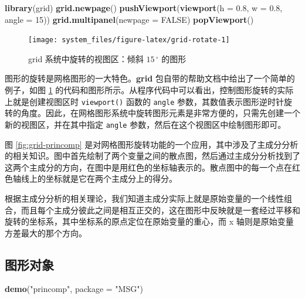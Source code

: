 \documentclass[
  b5paper,
  UTF8,twoside]{book}
\newenvironment{Shaded}{\begin{snugshade}}{\end{snugshade}}
\newcommand{\AttributeTok}[1]{\textcolor[rgb]{0.13,0.29,0.53}{#1}}
\newcommand{\ConstantTok}[1]{\textcolor[rgb]{0.56,0.35,0.01}{#1}}
\newcommand{\DecValTok}[1]{\textcolor[rgb]{0.00,0.00,0.81}{#1}}
\newcommand{\FloatTok}[1]{\textcolor[rgb]{0.00,0.00,0.81}{#1}}
\newcommand{\FunctionTok}[1]{\textcolor[rgb]{0.13,0.29,0.53}{\textbf{#1}}}
\newcommand{\NormalTok}[1]{#1}
\newcommand{\StringTok}[1]{\textcolor[rgb]{0.31,0.60,0.02}{#1}}
\begin{document}
\begin{Shaded}
\begin{Highlighting}[]
\FunctionTok{library}\NormalTok{(grid)}
\FunctionTok{grid.newpage}\NormalTok{()}
\FunctionTok{pushViewport}\NormalTok{(}\FunctionTok{viewport}\NormalTok{(}\AttributeTok{h =} \FloatTok{0.8}\NormalTok{, }\AttributeTok{w =} \FloatTok{0.8}\NormalTok{, }\AttributeTok{angle =} \DecValTok{15}\NormalTok{))}
\FunctionTok{grid.multipanel}\NormalTok{(}\AttributeTok{newpage =} \ConstantTok{FALSE}\NormalTok{)}
\FunctionTok{popViewport}\NormalTok{()}
\end{Highlighting}
\end{Shaded}

\begin{figure}

{\centering \texttt{[image: system\_files/figure-latex/grid-rotate-1]} 

}

\caption[grid 系统中旋转的视图区]{grid 系统中旋转的视图区：倾斜 \(15\,^{\circ}\) 的图形}\label{fig:grid-rotate}
\end{figure}





图形的旋转是网格图形的一大特色。\textbf{grid} 包自带的帮助文档中给出了一个简单的例子，如图 \ref{fig:grid-rotate} 的代码和图形所示。从程序代码中可以看出，控制图形旋转的实际上就是创建视图区时 \texttt{viewport()} 函数的 \texttt{angle} 参数，其数值表示图形逆时针旋转的角度。因此，在网格图形系统中旋转图形元素是非常方便的，只需先创建一个新的视图区，并在其中指定 \texttt{angle} 参数，然后在这个视图区中绘制图形即可。

图 \ref{fig:grid-princomp} 是对网格图形旋转功能的一个应用，其中涉及了主成分分析的相关知识。图中首先绘制了两个变量之间的散点图，然后通过主成分分析找到了这两个主成分的方向，在图中是用红色的坐标轴表示的。散点图中的每一个点在红色轴线上的坐标就是它在两个主成分上的得分。

根据主成分分析的相关理论，我们知道主成分实际上就是原始变量的一个线性组合，而且每个主成分彼此之间是相互正交的，这在图形中反映就是一套经过平移和旋转的坐标系，其中坐标系的原点定位在原始变量的重心，而 x 轴则是原始变量方差最大的那个方向。

\subsection{图形对象}\label{ux56feux5f62ux5bf9ux8c61}

\begin{Shaded}
\begin{Highlighting}[]
\FunctionTok{demo}\NormalTok{(}\StringTok{"princomp"}\NormalTok{, }\AttributeTok{package =} \StringTok{"MSG"}\NormalTok{)}
\end{Highlighting}
\end{Shaded}
\end{document}
